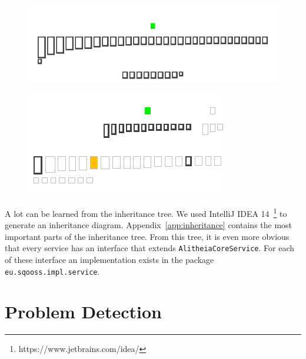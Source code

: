 \documentclass{article}
\begin{document}
\begin{figure}[h]
\centering
\begin{minipage}{.45\textwidth}
  \centering
  \includegraphics[width=0.9\linewidth]{daoobject-inheritance}
  \label{fig:daobject}
\end{minipage}\hspace{5mm}%
\begin{minipage}{.45\textwidth}
  \centering
  \includegraphics[width=0.9\linewidth]{alitheiacoreservice-inheritance}
  \label{fig:alitheiacoreservice}
\end{minipage}
\end{figure}

A lot can be learned from the inheritance tree. We used IntelliJ IDEA 14~\footnote{https://www.jetbrains.com/idea/} to generate an inheritance diagram. Appendix~\ref{app:inheritance} contains the most important parts of the inheritance tree. From this tree, it is even more obvious that every service has an interface that extends \verb|AlitheiaCoreService|. For each of these interface an implementation exists in the package \verb|eu.sqooss.impl.service|. %

\section{Problem Detection}
\end{document}
